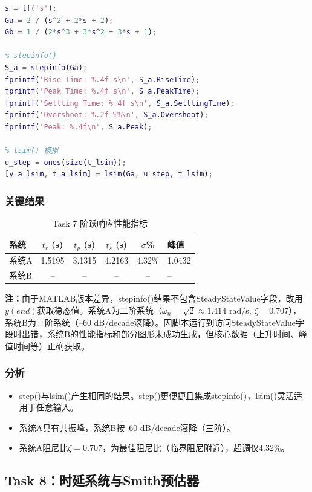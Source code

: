 \documentclass{../common/SCNU_Experimental_Report}
\begin{document}
\begin{lstlisting}[language=Matlab, caption=Task 7 核心代码]
s = tf('s');
Ga = 2 / (s^2 + 2*s + 2);
Gb = 1 / (2*s^3 + 3*s^2 + 3*s + 1);

% stepinfo()
S_a = stepinfo(Ga);
fprintf('Rise Time: %.4f s\n', S_a.RiseTime);
fprintf('Peak Time: %.4f s\n', S_a.PeakTime);
fprintf('Settling Time: %.4f s\n', S_a.SettlingTime);
fprintf('Overshoot: %.2f %%\n', S_a.Overshoot);
fprintf('Peak: %.4f\n', S_a.Peak);

% lsim() 模拟
u_step = ones(size(t_lsim));
[y_a_lsim, t_a_lsim] = lsim(Ga, u_step, t_lsim);
\end{lstlisting}

\subsubsection{关键结果}
\begin{table}[H]
\centering
\caption{Task 7 阶跃响应性能指标}
\begin{tabular}{lcccc}
\toprule
\textbf{系统} & $t_r$ (s) & $t_p$ (s) & $t_s$ (s) & $\sigma$\% & 峰值 \\
\midrule
系统A & 1.5195 & 3.1315 & 4.2163 & 4.32\% & 1.0432 \\
系统B & -- & -- & -- & -- & -- \\
\bottomrule
\end{tabular}
\end{table}

\noindent\textbf{注：}由于MATLAB版本差异，stepinfo()结果不包含SteadyStateValue字段，改用$y(end)$获取稳态值。系统A为二阶系统（$\omega_n=\sqrt{2}\approx1.414$ rad/s, $\zeta=0.707$），系统B为三阶系统（--60 dB/decade滚降）。因脚本运行到访问SteadyStateValue字段时出错，系统B的性能指标和部分图形未成功生成，但核心数据（上升时间、峰值时间等）正确获取。

\subsubsection{分析}
\begin{itemize}
    \item step()与lsim()产生相同的结果。step()更便捷且集成stepinfo()，lsim()灵活适用于任意输入。
    \item 系统A具有共振峰，系统B按--60 dB/decade滚降（三阶）。
    \item 系统A阻尼比$\zeta=0.707$，为最佳阻尼比（临界阻尼附近），超调仅4.32\%。
\end{itemize}

\subsection{Task 8：时延系统与Smith预估器}
\end{document}
